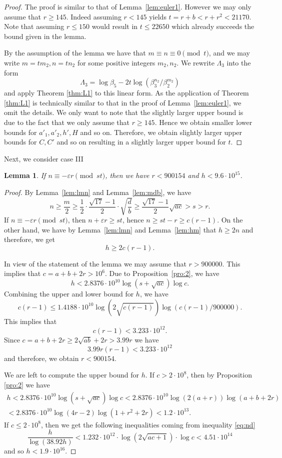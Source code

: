 \documentclass{amsart}
\newtheorem{lemma}{Lemma}
\theoremstyle{definition}
\begin{document}
\begin{proof}
 The proof is similar to that of Lemma~\ref{lem:euler1}. However we may only assume that $r \geq 145$. Indeed assuming $r<145$ yields $t=r+b<r+r^2<21170$.
 Note that assuming $r\leq 150$ would result in $t\leq 22650$ which already succeeds the bound given in the lemma.
  
 
By the assumption of the lemma we have that $m\equiv n\equiv 0 \pmod{t}$, and we may 
write $m=tm_2, n=tn_2$ for some positive integers $m_2,n_2$. We rewrite $\Lambda_3$ into the form
$$
\Lambda_3 = \log\beta_5 - 2t\log \left({\beta_3^{n_2}}/{\beta_2^{m_2}}\right)
$$
and apply Theorem \ref{thm:L1} to this linear form. As the application of Theorem \ref{thm:L1} is technically similar to that in the proof of  Lemma~\ref{lem:euler1}, we omit the details.
We only want to note that the slightly larger upper bound is due to the fact that we only assume that $r\geq 145$. Hence we 
obtain smaller lower bounds for $a'_1,a'_2,h',H$ and so on. Therefore, we obtain slightly larger upper bounds for $C,C'$ and so on resulting in a slightly larger upper bound for $t$. 
\end{proof}

Next, we consider case III

\begin{lemma}\label{lem:euler3}
If $n\equiv -\varepsilon r \pmod{st}$, then we have $r<900154$ and $h<9.6 \cdot 10^{15}$.
\end{lemma}

\begin{proof} By Lemma~\ref{lem:lmn} and Lemma~\ref{lem:mdb}, we have 
$$
n\ge \frac m2\geq \frac{1}{2}\cdot \frac{\sqrt{17}-1}{2}\cdot \sqrt{\frac{d}{b}}\ge \frac{\sqrt{17}-1}{2}\sqrt{ac}>s>r.
$$
If $n\equiv -\varepsilon r \pmod{st}$, then $n+\varepsilon r \ge st$, hence 
$n\ge st -r\ge c(r-1)$. On the other hand, we have by Lemma~\ref{lem:lmn} and Lemma~\ref{lem:hm} that $h\ge 2n$ and therefore, we get 
$$h\ge 2c(r-1).$$

In view of the statement of the lemma we may assume that $r>900000$.  This implies that $c=a+b+2r>10^6$.  Due to Proposition~\ref{pro:2}, we have
$$
h<2.8376\cdot 10^{10} \log (s+\sqrt{ac}) \log c.
$$
Combining the upper and lower bound for $h$, we have 
$$
c(r-1)\le 1.4188 \cdot 10^{10} \log(2\sqrt{c(r-1)})\log(c(r-1)/900000).
$$
This implies that
$$c(r-1)<3.233\cdot 10^{12}.$$
Since $c=a+b+2r\ge 2\sqrt{ab}+ 2r >3.99r$ we have
$$3.99r(r-1)< 3.233\cdot 10^{12}$$
and therefore, we obtain $r<900154$.

We are left to compute the upper bound for $h$. If $c>2\cdot 10^8$, then by Proposition \ref{pro:2} we have
\begin{multline*}
h<2.8376\cdot 10^{10} \log (s+\sqrt{ac}) \log c<2.8376\cdot 10^{10}\log(2(a+r))\log(a+b+2r)\\<2.8376\cdot 10^{10}\log(4r-2)\log(1+r^2+2r)<1.2\cdot 10^{13}.
\end{multline*}
If $c\le 2\cdot 10^8$, then we get the following inequalities coming from inequality \eqref{eq:nd}
$$
\frac{h}{\log(38.92h)}< 1.232\cdot 10^{12}\cdot \log (2\sqrt{ac+1})\cdot \log c<4.51 \cdot 10^{14}
$$ 
and so $h<1.9\cdot 10^{16}$. 
\end{proof}
\end{document}
